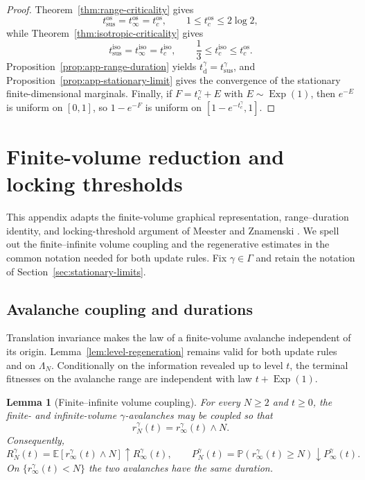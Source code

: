 \documentclass[11pt,a4paper]{amsart}
\newtheorem{lemma}[theorem]{Lemma}
\theoremstyle{remark}
\begin{document}
\begin{proof}
Theorem~\ref{thm:range-criticality} gives
\[
        t_{\mathrm{sus}}^{\mathrm{os}}
        =t_\infty^{\mathrm{os}}
        =t_c^{\mathrm{os}},
        \qquad
        1\leq t_c^{\mathrm{os}}\leq2\log2,
\]
while Theorem~\ref{thm:isotropic-criticality} gives
\[
        t_{\mathrm{sus}}^{\mathrm{iso}}
        =t_\infty^{\mathrm{iso}}
        =t_c^{\mathrm{iso}},
        \qquad
        \frac13\leq t_c^{\mathrm{iso}}
        \leq t_c^{\mathrm{os}}.
\]
Proposition~\ref{prop:app-range-duration} yields
$t_{\mathrm d}^\gamma=t_{\mathrm{sus}}^\gamma$, and
Proposition~\ref{prop:app-stationary-limit} gives the convergence of the
stationary finite-dimensional marginals. Finally, if
$F=t_c^\gamma+E$ with $E\sim\operatorname{Exp}(1)$, then $e^{-E}$ is
uniform on $[0,1]$, so $1-e^{-F}$ is uniform on
$[1-e^{-t_c^\gamma},1]$.
\end{proof}

\appendix

\section{Finite-volume reduction and locking thresholds}
\label{app:mz-reduction}

This appendix adapts the finite-volume graphical representation,
range--duration identity, and locking-threshold argument of Meester and
Znamenski \cite{MZ04}. We spell out the finite--infinite volume coupling
and the regenerative estimates in the common notation needed for both
update rules. Fix $\gamma\in\Gamma$ and retain the notation of
Section~\ref{sec:stationary-limits}.

\subsection{Avalanche coupling and durations}

Translation invariance makes the law of a finite-volume avalanche
independent of its origin. Lemma~\ref{lem:level-regeneration} remains
valid for both update rules and on $\Lambda_N$. Conditionally on the
information revealed up to level $t$, the terminal fitnesses on the
avalanche range are independent with law $t+\operatorname{Exp}(1)$.

\begin{lemma}[Finite--infinite volume coupling]
\label{lem:app-finite-infinite}
For every $N\geq2$ and $t\geq0$, the finite- and infinite-volume
$\gamma$-avalanches may be coupled so that
\[
        r_N^\gamma(t)=r_\infty^\gamma(t)\wedge N.
\]
Consequently,
\[
        R_N^\gamma(t)
        =\mathbb{E}[r_\infty^\gamma(t)\wedge N]
        \uparrow R_\infty^\gamma(t),
        \qquad
        P_N^\gamma(t)
        =\mathbb{P}(r_\infty^\gamma(t)\geq N)
        \downarrow P_\infty^\gamma(t).
\]
On $\{r_\infty^\gamma(t)<N\}$ the two avalanches have the same duration.
\end{lemma}
\end{document}

